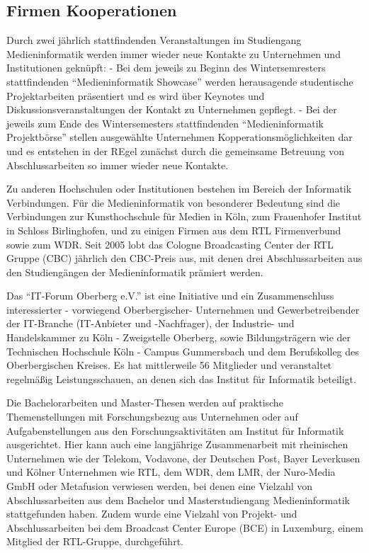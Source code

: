 \subsection{Firmen Kooperationen}\label{firmen-kooperationen}

Durch zwei jährlich stattfindenden Veranstaltungen im Studiengang
Medieninformatik werden immer wieder neue Kontakte zu Unternehmen und
Institutionen geknüpft: - Bei dem jeweils zu Beginn des Wintersemresters
stattfindenden ``Medieninformatik Showcase'' werden herausagende
studentische Projektarbeiten präsentiert und es wird über Keynotes und
Diskussionsveranstaltungen der Kontakt zu Unternehmen gepflegt. - Bei
der jeweils zum Ende des Wintersemesters stattfindenden
``Medieninformatik Projektbörse'' stellen ausgewählte Unternehmen
Kopperationsmöglichkeiten dar und es entstehen in der REgel zunächst
durch die gemeinsame Betreuung von Abschlussarbeiten so immer wieder
neue Kontakte.

Zu anderen Hochschulen oder Institutionen bestehen im Bereich der
Informatik Verbindungen. Für die Medieninformatik von besonderer
Bedeutung sind die Verbindungen zur Kunsthochschule für Medien in Köln,
zum Frauenhofer Institut in Schloss Birlinghofen, und zu einigen Firmen
aus dem RTL Firmenverbund sowie zum WDR. Seit 2005 lobt das Cologne
Broadcasting Center der RTL Gruppe (CBC) jährlich den CBC-Preis aus, mit
denen drei Abschlussarbeiten aus den Studiengängen der Medieninformatik
prämiert werden.

Das ``IT-Forum Oberberg e.V.'' ist eine Initiative und ein
Zusammenschluss interessierter - vorwiegend Oberbergischer- Unternehmen
und Gewerbetreibender der IT-Branche (IT-Anbieter und -Nachfrager), der
Industrie- und Handelskammer zu Köln - Zweigstelle Oberberg, sowie
Bildungsträgern wie der Technischen Hochschule Köln - Campus Gummersbach
und dem Berufskolleg des Oberbergischen Kreises. Es hat mittlerweile 56
Mitglieder und veranstaltet regelmäßig Leistungsschauen, an denen sich
das Institut für Informatik beteiligt.

Die Bachelorarbeiten und Master-Thesen werden auf praktische
Themenstellungen mit Forschungsbezug aus Unternehmen oder auf
Aufgabenstellungen aus den Forschungsaktivitäten am Institut für
Informatik ausgerichtet. Hier kann auch eine langjährige Zusammenarbeit
mit rheinischen Unternehmen wie der Telekom, Vodavone, der Deutschen
Post, Bayer Leverkusen und Kölner Unternehmen wie RTL, dem WDR, dem LMR,
der Nuro-Media GmbH oder Metafusion verwiesen werden, bei denen eine
Vielzahl von Abschlussarbeiten aus dem Bachelor und Masterstudiengang
Medieninformatik stattgefunden haben. Zudem wurde eine Vielzahl von
Projekt- und Abschlussarbeiten bei dem Broadcast Center Europe (BCE) in
Luxemburg, einem Mitglied der RTL-Gruppe, durchgeführt.

